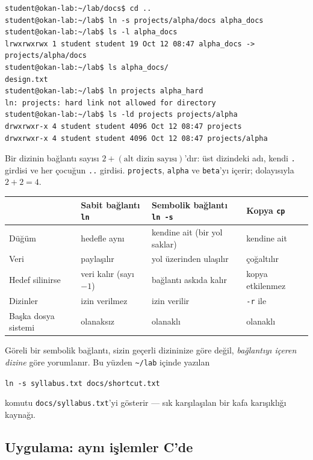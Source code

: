 \documentclass[11pt,a4paper]{article}
\newcommand{\cmd}[1]{\texttt{#1}}
\begin{document}
\begin{lstlisting}[style=term]
student@okan-lab:~/lab/docs$ cd ..
student@okan-lab:~/lab$ ln -s projects/alpha/docs alpha_docs
student@okan-lab:~/lab$ ls -l alpha_docs
lrwxrwxrwx 1 student student 19 Oct 12 08:47 alpha_docs -> projects/alpha/docs
student@okan-lab:~/lab$ ls alpha_docs/
design.txt
student@okan-lab:~/lab$ ln projects alpha_hard
ln: projects: hard link not allowed for directory
student@okan-lab:~/lab$ ls -ld projects projects/alpha
drwxrwxr-x 4 student student 4096 Oct 12 08:47 projects
drwxrwxr-x 4 student student 4096 Oct 12 08:47 projects/alpha
\end{lstlisting}

Bir dizinin bağlantı sayısı $2 + (\text{alt dizin sayısı})$'dır: üst dizindeki adı, kendi \texttt{.} girdisi ve her çocuğun \texttt{..} girdisi. \texttt{projects}, \texttt{alpha} ve \texttt{beta}'yı içerir; dolayısıyla $2 + 2 = 4$.

\begin{center}
\renewcommand{\arraystretch}{1.2}
\begin{tabularx}{\linewidth}{l >{\raggedright\arraybackslash}X >{\raggedright\arraybackslash}X >{\raggedright\arraybackslash}X}
\toprule
 & \textbf{Sabit bağlantı \cmd{ln}} & \textbf{Sembolik bağlantı \cmd{ln -s}} & \textbf{Kopya \cmd{cp}} \\
\midrule
Düğüm & hedefle aynı & kendine ait (bir yol saklar) & kendine ait \\
Veri & paylaşılır & yol üzerinden ulaşılır & çoğaltılır \\
Hedef silinirse & veri kalır (sayı $-1$) & bağlantı askıda kalır & kopya etkilenmez \\
Dizinler & izin verilmez & izin verilir & \cmd{-r} ile \\
Başka dosya sistemi & olanaksız & olanaklı & olanaklı \\
\bottomrule
\end{tabularx}
\end{center}

Göreli bir sembolik bağlantı, sizin geçerli dizininize göre değil, \emph{bağlantıyı içeren dizine} göre yorumlanır. Bu yüzden \texttt{\textasciitilde/lab} içinde yazılan
\begin{center}\cmd{ln -s syllabus.txt docs/shortcut.txt}\end{center}
komutu \texttt{docs/syllabus.txt}'yi gösterir --- sık karşılaşılan bir kafa karışıklığı kaynağı.

\subsection{Uygulama: aynı işlemler C'de}
\end{document}
